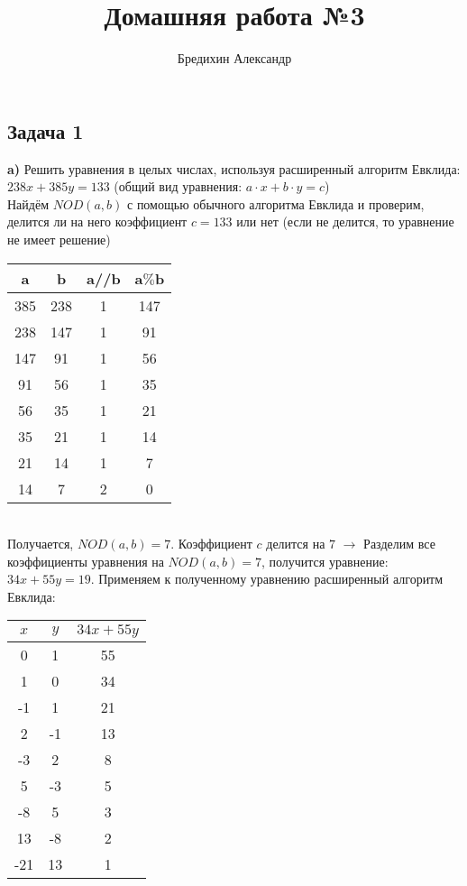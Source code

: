 \documentclass[a4paper,12pt]{article} %
\author{Бредихин Александр}
\title{Домашняя работа №3}
\begin{document}

\maketitle

\subsection*{Задача 1}
{\bf a)} Решить уравнения в целых числах, используя расширенный алгоритм Евклида: $ 238x +385y = 133 $ (общий вид уравнения: $ a \cdot x + b \cdot y = c $) \\

Найдём $ NOD(a,b) $ с помощью обычного алгоритма Евклида и проверим, делится ли на него коэффициент $c = 133 $ или нет (если не делится, то уравнение не имеет решение)\\

\begin{tabular}{|c|c|c|c|}
\hline 
a & b & a//b & a$\%$b \\ 
\hline 
385 & 238 & 1 & 147 \\ 
\hline 
238 & 147 & 1 & 91 \\ 
\hline 
147 & 91 & 1 & 56 \\ 
\hline 
91 & 56 & 1 & 35 \\ 
\hline 
56 & 35 & 1 & 21 \\ 
\hline 
35 & 21 & 1 & 14 \\ 
\hline 
21 & 14 & 1 & 7 \\ 
\hline 
14 & 7 & 2 & 0 \\ 
\hline 
\end{tabular} \\

Получается, $ NOD(a,b) = 7 $. Коэффициент $ c $ делится на $ 7 $ $ \longrightarrow $ Разделим все коэффициенты уравнения на $ NOD(a,b) = 7 $, получится уравнение: 
$ 34x + 55y = 19 $. Применяем к полученному уравнению расширенный алгоритм Евклида:\\

\begin{tabular}{|c|c|c|}
\hline 
$x$ & $y$ & $34x + 55y$ \\ 
\hline 
0 & 1 & 55 \\ 
\hline 
1 & 0 & 34 \\ 
\hline 
-1 & 1 & 21 \\ 
\hline 
2 & -1 & 13 \\ 
\hline 
-3 & 2 & 8 \\ 
\hline 
5 & -3 & 5 \\ 
\hline 
-8 & 5 & 3 \\ 
\hline 
13 & -8 & 2 \\ 
\hline 
-21 & 13 & 1 \\ 
\hline 
\end{tabular} \\
\end{document}
